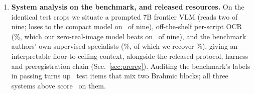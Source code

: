 \begin{enumerate}
  scripts ($\bpeRatioMin\times$--$\bpeRatioMax\times$; sign test $p=\bpeSignP$), isolating
  \emph{output-space structure}, not synthetic fine-tuning per se, as the driver; a from-scratch
  CRNN replicates the \emph{direction} across an architecture with no large-scale pretraining but
  not the magnitude, and we report the ambiguity rather than resolve it in our favor.
  \item \textbf{System analysis on the benchmark, and released resources.} On the identical test
  crops we situate a prompted 7B frontier VLM (reads two of nine; loses to the compact model on
  \vlmScriptsWon\ of nine), off-the-shelf per-script OCR (\tessMean\%, which our zero-real-image model beats
  on \tessScriptsWon\ of nine), and the benchmark authors' own supervised specialists
  (\parseqMean\%, of which we recover \oursOverCeilingPct\%), giving an interpretable floor-to-ceiling
  context, alongside the released protocol, harness and preregistration chain
  (Sec.~\ref{sec:prereg}). Auditing the benchmark's labels in passing turns up \rtCrossN\ test
  items that mix two Brahmic blocks; all three systems above score \rtCrossSolved\ on them.
\end{enumerate}

